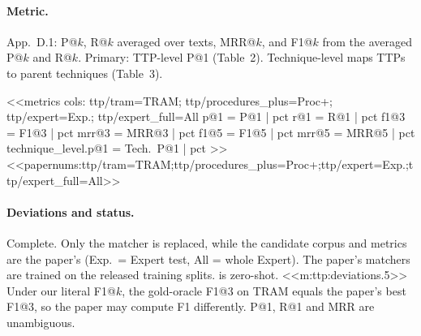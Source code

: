 \paragraph{Metric.} App.~D.1: P@$k$, R@$k$ averaged over texts, MRR@$k$, and F1@$k$ from the averaged P@$k$ and
R@$k$. Primary: TTP-level P@1 (Table~2). Technique-level maps TTPs to parent techniques (Table~3).

<<metrics
cols: ttp/tram=TRAM; ttp/procedures_plus=Proc+; ttp/expert=Exp.; ttp/expert_full=All
p@1 = P@1 | pct
r@1 = R@1 | pct
f1@3 = F1@3 | pct
mrr@3 = MRR@3 | pct
f1@5 = F1@5 | pct
mrr@5 = MRR@5 | pct
technique_level.p@1 = Tech.\ P@1 | pct
>>
<<papernums:ttp/tram=TRAM;ttp/procedures_plus=Proc+;ttp/expert=Exp.;ttp/expert_full=All>>

\paragraph{Deviations and status.} Complete. Only the matcher is replaced, while the candidate corpus and metrics are
the paper's (Exp.\ = Expert test, All = whole Expert). The paper's matchers are trained on the released training
splits. \jev{} is zero-shot. <<m:ttp:deviations.5>> Under our literal F1@$k$, the gold-oracle F1@3 on TRAM equals the
paper's best F1@3, so the paper may compute F1 differently. P@1, R@1 and MRR are unambiguous.
